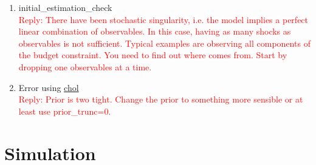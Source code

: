 \documentclass[cn,10pt,math=newtx,citestyle=gb7714-2015,bibstyle=gb7714-2015]{elegantbook}
\begin{document}
{{\begin{enumerate}
		\textcolor{red}{Reply:
			\begin{itemize}
				\item The issue in the end always is to find the global mode. What you describe is a iterative procedure to find it and it sounds reasonable. However, you should keep track of whether there is actual improvement in the posterior density across runs( and particularly the MCMC). If you are unsure where the mode is and you have rather diffuse priors that do not smooth out the likelihood by much, mode\_compute=4 is not advisable, because it tends to get stuck at local modes.
				\item Sequentially running different mode\_compute makes a lot of sense. In case you did not find the true mode, you increase the likelihood of finding it. In case you already found it, running mode\_compute a second time will just cost your time, but will not do any other harm as the optimizer will stay at the same mode you found before. Using the calibrated value as starting values is recommented in case your mode\_compute fails because of invalid starting values.
			\end{itemize}
		}
		\item initial\_estimation\_check\\
		\textcolor{red}{Reply: There have been stochastic singularity, i.e. the model implies a perfect linear combination of observables. In this case, having as many shocks as observables is not sufficient. Typical examples are observing all components of the budget constraint. You need to find out where comes from. Start by dropping one observables at a time.}
		\item Error using \underline{chol}\\
		\textcolor{red}{Reply: Prior is two tight. Change the prior to something more sensible or at least use prior\_trunc=0.}
		
		
		
		
	\end{enumerate}
	
	\section{Simulation}
	
}}
\end{document}
